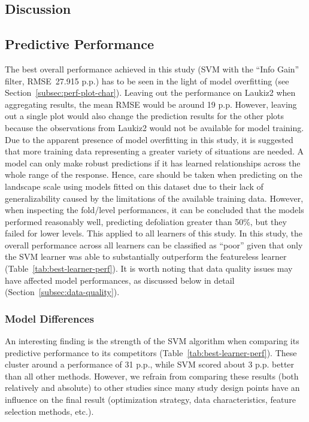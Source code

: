 \documentclass[remotesensing,article,accept,moreauthors,pdftex]{Definitions/mdpi}
\begin{document}
\begin{paracol}{2}
\switchcolumn



\section{Discussion}

\subsection{Predictive Performance}

The best overall performance achieved in this study (SVM with the \enquote{Info Gain} filter, RMSE~27.915 p.p.) has to be seen in the light of model overfitting (see Section~\ref{subsec:perf-plot-char}).
Leaving out the performance on Laukiz2 when aggregating results, the mean RMSE would be around 19 p.p.
However, leaving out a single plot would also change the prediction results for the other plots because the observations from Laukiz2 would not be available for model training.
Due to the apparent presence of model overfitting in this study, it is suggested that more training data representing a greater variety of situations are needed.
A model can only make robust predictions if it has learned relationships across the whole range of the response.
Hence, care should be taken when predicting on the landscape scale using models fitted on this dataset due to their lack of generalizability caused by the limitations of the available training data.
However, when inspecting the fold\-/level performances, it can be concluded that the models performed reasonably well, predicting defoliation greater than 50\%, but they failed for lower levels.
This applied to all learners of this study.
In this study, the overall performance across all learners can be classified as ``poor'' given that only the SVM learner was able to substantially outperform the featureless learner \linebreak (Table~\ref{tab:best-learner-perf}).
It is worth noting that data quality issues may have affected model performances, as discussed below in detail  (Section~\ref{subsec:data-quality}).

\subsubsection{Model Differences}

An interesting finding is the strength of the SVM algorithm when comparing its predictive performance to its competitors (Table~\ref{tab:best-learner-perf}).
These cluster around a performance of 31 p.p., while SVM scored about 3 p.p. better than all other methods.
However, we refrain from comparing these results (both relatively and absolute) to other studies since many study design points have an influence on the final result (optimization strategy, data characteristics, feature selection methods, etc.).


\end{paracol}
\end{document}

